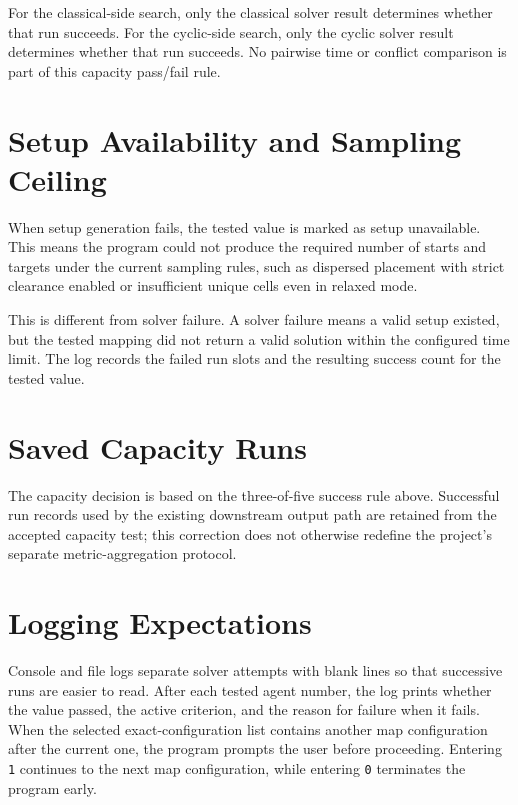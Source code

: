 \documentclass[11pt]{article}
\begin{document}
For the classical-side search, only the classical solver result determines whether that run succeeds. For the cyclic-side search, only the cyclic solver result determines whether that run succeeds. No pairwise time or conflict comparison is part of this capacity pass/fail rule.

\section{Setup Availability and Sampling Ceiling}

When setup generation fails, the tested value is marked as setup unavailable. This means the program could not produce the required number of starts and targets under the current sampling rules, such as dispersed placement with strict clearance enabled or insufficient unique cells even in relaxed mode.

This is different from solver failure. A solver failure means a valid setup existed, but the tested mapping did not return a valid solution within the configured time limit. The log records the failed run slots and the resulting success count for the tested value.

\section{Saved Capacity Runs}

The capacity decision is based on the three-of-five success rule above. Successful run records used by the existing downstream output path are retained from the accepted capacity test; this correction does not otherwise redefine the project's separate metric-aggregation protocol.

\section{Logging Expectations}

Console and file logs separate solver attempts with blank lines so that successive runs are easier to read. After each tested agent number, the log prints whether the value passed, the active criterion, and the reason for failure when it fails. When the selected exact-configuration list contains another map configuration after the current one, the program prompts the user before proceeding. Entering \texttt{1} continues to the next map configuration, while entering \texttt{0} terminates the program early.
\end{document}
